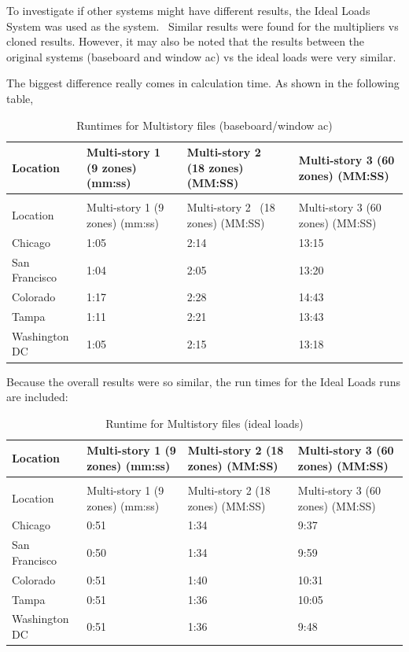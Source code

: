 To investigate if other systems might have different results, the Ideal Loads System was used as the system.~ Similar results were found for the multipliers vs cloned results. However, it may also be noted that the results between the original systems (baseboard and window ac) vs the ideal loads were very similar.

The biggest difference really comes in calculation time. As shown in the following table,

\begin{longtable}[c]{p{1.5in}p{1.5in}p{1.5in}p{1.5in}}
\caption{Runtimes for Multistory files (baseboard/window ac) \label{table:runtimes-for-multistory-files-baseboardwindow}} \tabularnewline
\toprule 
Location & Multi-story 1 (9 zones) (mm:ss) & Multi-story 2~ (18 zones) (MM:SS) & Multi-story 3 (60 zones) (MM:SS) \tabularnewline
\midrule
\endfirsthead

\caption[]{Runtimes for Multistory files (baseboard/window ac)} \tabularnewline
\toprule 
Location & Multi-story 1 (9 zones) (mm:ss) & Multi-story 2~ (18 zones) (MM:SS) & Multi-story 3 (60 zones) (MM:SS) \tabularnewline
\midrule
\endhead

Chicago & 1:05 & 2:14 & 13:15 \tabularnewline
San Francisco & 1:04 & 2:05 & 13:20 \tabularnewline
Colorado & 1:17 & 2:28 & 14:43 \tabularnewline
Tampa & 1:11 & 2:21 & 13:43 \tabularnewline
Washington DC & 1:05 & 2:15 & 13:18 \tabularnewline
\bottomrule
\end{longtable}

Because the overall results were so similar, the run times for the Ideal Loads runs are included:

\begin{longtable}[c]{p{1.5in}p{1.5in}p{1.5in}p{1.5in}}
\caption{Runtime for Multistory files (ideal loads) \label{table:runtime-for-multistory-files-ideal-loads}} \tabularnewline
\toprule 
Location & Multi-story 1 (9 zones) (mm:ss) & Multi-story 2 (18 zones) (MM:SS) & Multi-story 3 (60 zones) (MM:SS) \tabularnewline
\midrule
\endfirsthead

\caption[]{Runtime for Multistory files (ideal loads)} \tabularnewline
\toprule 
Location & Multi-story 1 (9 zones) (mm:ss) & Multi-story 2 (18 zones) (MM:SS) & Multi-story 3 (60 zones) (MM:SS) \tabularnewline
\midrule
\endhead

Chicago & 0:51 & 1:34 & 9:37 \tabularnewline
San Francisco & 0:50 & 1:34 & 9:59 \tabularnewline
Colorado & 0:51 & 1:40 & 10:31 \tabularnewline
Tampa & 0:51 & 1:36 & 10:05 \tabularnewline
Washington DC & 0:51 & 1:36 & 9:48 \tabularnewline
\bottomrule
\end{longtable}

